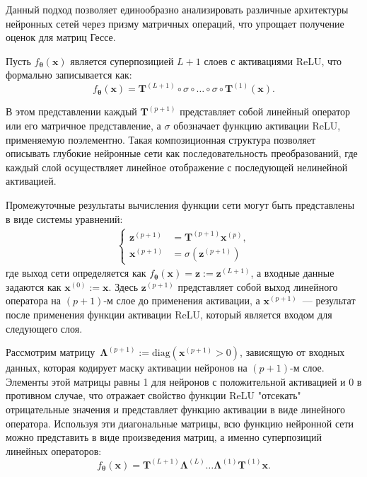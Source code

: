 Данный подход позволяет единообразно анализировать различные архитектуры нейронных сетей через призму матричных операций, что упрощает получение оценок для матриц Гессе.

Пусть $f_{\boldsymbol{\theta}}(\mathbf{x})$ является суперпозицией $L+1$ слоев с активациями ReLU, что формально записывается как:
\[
    f_{\boldsymbol{\theta}}(\mathbf{x}) = \mathbf{T}^{(L+1)} \circ \sigma \circ \dots \circ \sigma \circ \mathbf{T}^{(1)}(\mathbf{x}).
\]

В этом представлении каждый $\mathbf{T}^{(p+1)}$ представляет собой линейный оператор или его матричное представление, а $\sigma$ обозначает функцию активации ReLU, применяемую поэлементно.
Такая композиционная структура позволяет описывать глубокие нейронные сети как последовательность преобразований, где каждый слой осуществляет линейное отображение с последующей нелинейной активацией.

Промежуточные результаты вычисления функции сети могут быть представлены в виде системы уравнений:
\begin{align}
  \begin{cases}
    \mathbf{z}^{(p+1)} &= \mathbf{T}^{(p+1)}\mathbf{x}^{(p)}, \\
    \mathbf{x}^{(p+1)} &= \sigma(\mathbf{z}^{(p+1)})
  \end{cases}
\end{align}
где выход сети определяется как $f_{\boldsymbol{\theta}}(\mathbf{x}) = \mathbf{z} := \mathbf{z}^{(L+1)}$, а входные данные задаются как $\mathbf{x}^{(0)} := \mathbf{x}$.
Здесь $\mathbf{z}^{(p+1)}$ представляет собой выход линейного оператора на $(p+1)$-м слое до применения активации, а $\mathbf{x}^{(p+1)}$~--- результат после применения функции активации ReLU, который является входом для следующего слоя.

Рассмотрим матрицу~$\boldsymbol{\Lambda}^{(p+1)} := \mathrm{diag}(\mathbf{x}^{(p+1)} > 0)$, зависящую от входных данных, которая кодирует маску активации нейронов на $(p+1)$-м слое.
Элементы этой матрицы равны 1 для нейронов с положительной активацией и 0 в противном случае, что отражает свойство функции ReLU "отсекать" отрицательные значения и представляет функцию активации в виде линейного оператора.
Используя эти диагональные матрицы, всю функцию нейронной сети можно представить в виде произведения матриц, а именно суперпозиций линейных операторов:
\begin{equation}\label{eq::m-net:repr}
    f_{\boldsymbol{\theta}}(\mathbf{x}) = \mathbf{T}^{(L+1)}\boldsymbol{\Lambda}^{(L)}\dots \boldsymbol{\Lambda}^{(1)}\mathbf{T}^{(1)}\mathbf{x}.
\end{equation}

